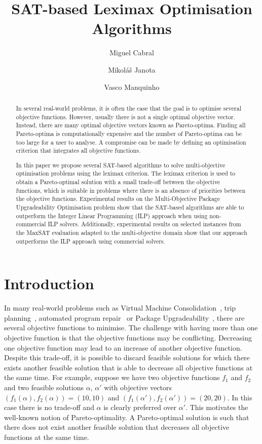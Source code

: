 \documentclass[a4paper,UKenglish,cleveref, autoref, thm-restate]{lipics-v2021}
\title{SAT-based Leximax Optimisation Algorithms}
\author{Miguel Cabral}{INESC-ID, IST - Universidade de Lisboa, Portugal}{miguel.cabral@tecnico.ulisboa.pt}{}{}
\author{Mikol\'a\v s Janota}{Czech Technical University Prague, Czechia}{mikolas.janota@gmail.com}{https://orcid.org/0000-0003-3487-784X}{}
\author{Vasco Manquinho}{INESC-ID, IST - Universidade de Lisboa, Portugal}{vasco.manquinho@tecnico.ulisboa.pt}{https://orcid.org/0000-0002-4205-2189}{}
\begin{document}
\maketitle

\begin{abstract}
In several real-world problems, it is often the case that the goal is to optimise several objective functions. However, usually there is not a single optimal objective vector.
Instead, there are many optimal objective vectors known as Pareto-optima.
Finding all Pareto-optima is computationally expensive and the number of Pareto-optima can be too large for a user to analyse. 
A compromise can be made by defining an optimisation criterion that integrates all objective functions.

In this paper we propose several SAT-based algorithms to
solve multi-objective optimisation problems using the leximax criterion.
The leximax criterion is used to obtain a Pareto-optimal solution with a 
small trade-off between the objective functions, which is suitable in 
problems where there is an absence of priorities between the objective functions.
Experimental results on the Multi-Objective Package Upgradeability Optimisation problem show that the SAT-based algorithms are able to outperform the Integer Linear Programming (ILP) approach when using non-commercial ILP solvers.
Additionally, experimental results on selected instances from the MaxSAT evaluation adapted to the multi-objective domain show that our approach outperforms the ILP approach using commercial solvers.
\end{abstract}

\section{Introduction}
\label{sec:intro}

In many real-world problems such as Virtual Machine Consolidation~\cite{DBLP:journals/fgcs/LiZLY20}, trip planning~\cite{DBLP:journals/eswa/MarquesRR19},
automated program repair~\cite{DBLP:journals/tse/YuanB20} or Package Upgradeability~\cite{DBLP:journals/jsat/JanotaLMM12}, there
are several objective functions to minimise. 
The challenge with having more than one objective function is that the objective functions may be conflicting. Decreasing one objective function may lead to an increase of another objective function. 
Despite this trade-off, it is possible to discard feasible solutions for which there exists another feasible solution that is able to decrease all objective functions at the same time.
For example, suppose we have two objective functions $f_1$ and $f_2$ and two feasible solutions $\alpha$, $\alpha'$ with objective vectors $(f_1(\alpha),f_2(\alpha))=(10,10)$ and $(f_1(\alpha'),f_2(\alpha'))=(20,20)$. In this case there is no trade-off and $\alpha$ is clearly preferred over $\alpha'$.
This motivates the well-known notion of Pareto-optimality. A Pareto-optimal solution is such that there does not exist another feasible solution that decreases all objective functions at the same time.
\end{document}
